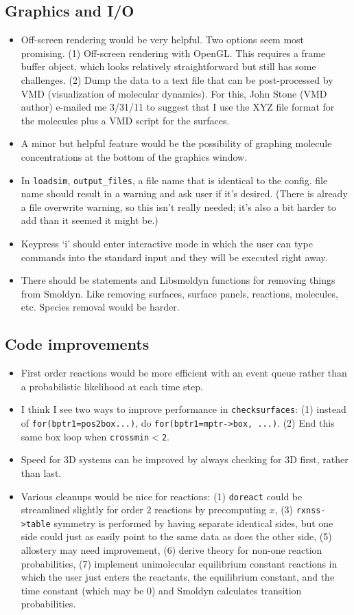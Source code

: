 \documentclass {scrbook}
\newcommand {\ttt} {\texttt}
\begin{document}
\subsection{Graphics and I/O}
\begin{itemize}
\item Off-screen rendering would be very helpful. Two options seem most promising. (1) Off-screen rendering with OpenGL. This requires a frame buffer object, which looks relatively straightforward but still has some challenges. (2) Dump the data to a text file that can be post-processed by VMD (visualization of molecular dynamics). For this, John Stone (VMD author) e-mailed me 3/31/11 to suggest that I use the XYZ file format for the molecules plus a VMD script for the surfaces.
\item A minor but helpful feature would be the possibility of graphing molecule concentrations at the bottom of the graphics window.
\item In \ttt{loadsim}, \ttt{output\_files}, a file name that is identical to the config. file name should result in a warning and ask user if it's desired. (There is already a file overwrite warning, so this isn't really needed; it's also a bit harder to add than it seemed it might be.)
\item Keypress `i' should enter interactive mode in which the user can type commands into the standard input and they will be executed right away.
\item There should be statements and Libsmoldyn functions for removing things from Smoldyn. Like removing surfaces, surface panels, reactions, molecules, etc. Species removal would be harder.
\end{itemize}

\subsection{Code improvements}
\begin{itemize}
\item First order reactions would be more efficient with an event queue rather than a probabilistic likelihood at each time step.
\item I think I see two ways to improve performance in \ttt{checksurfaces}: (1) instead of \lstinline{for(bptr1=pos2box...)}, do \lstinline{for(bptr1=mptr->box, ...)}. (2) End this same box loop when \ttt{crossmin$<$2}.
\item Speed for 3D systems can be improved by always checking for 3D first, rather than last.
\item Various cleanups would be nice for reactions: (1) \ttt{doreact} could be streamlined slightly for order 2 reactions by precomputing $x$, (3) \ttt{rxnss->table} symmetry is performed by having separate identical sides, but one side could just as easily point to the same data as does the other side, (5) allostery may need improvement, (6) derive theory for non-one reaction probabilities, (7) implement unimolecular equilibrium constant reactions in which the user just enters the reactants, the equilibrium constant, and the time constant (which may be 0) and Smoldyn calculates transition probabilities.
\end{itemize}
\end{document}
